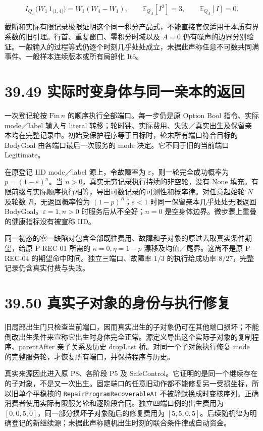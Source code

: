 \documentclass[
  11pt,
  oneside]{book}
\begin{document}
\[I_{Q_A}\bigl(W_1\,1_{(1,4]}\bigr)=W_1(W_4-W_1),
\qquad \mathbb E_{Q_A}[I^2]=3,\qquad\mathbb E_{Q_A}[I]=0.\]

截断和实际有限记录极限证明这个同一积分产品式，不能直接套仅适用于本质有界系数的旧引理。行首、重复窗口、零积分时域以及 \(A=0\) 仍有噪声的边界分别验证。一般输入的过程等式仍逐个时刻几乎处处成立，未据此声称任意不可数共同满事件、一般样本连续版本或所有局部化 Itô。

\section{39.49 实际时变身体与同一亲本的返回}\label{ux5b9eux9645ux65f6ux53d8ux8eabux4f53ux4e0eux540cux4e00ux4eb2ux672cux7684ux8fd4ux56de}

一次登记轮按 \(\mathrm{Fin}\,n\) 的顺序执行全部端口。每一步仍是原 Option Bool 指令、实际 mode／label 输入与 literal 转移；轮时钟、实际费用、失败／真实出生及保留亲本均在完整记录中。初始受保护程序等于目标时，轮末所有端口符合目标的 BodyGoal 由各端口最后一次服务的 mode 决定。它不同于旧的当前端口 Legitimate。

在原登记 IID mode／label 源上，令故障率为 \(\varepsilon\)，则一轮完全成功概率为 \(p=(1-\varepsilon)^n\)。当 \(n>0\)，真实无穷记录执行持续的非空轮，没有 None 填充。有限前缀与实际顺序执行相等，导出可数记录的可测性和概率律。对任意起始轮 \(N\) 及轮数 \(R\)，无返回概率恰为 \((1-p)^R\)；\(\varepsilon<1\) 时同一保留亲本几乎处处无限返回 BodyGoal。\(\varepsilon=1,n>0\) 时服务后从不全好；\(n=0\) 是空身体边界。微步骤上重叠的健康指标没有被宣称 IID。

同一初态的零一缺陷对包含全部既往费用、故障和子对象的原过去取真实条件期望，给原 P-REC-01 所需的 \(\kappa=0,\eta=1-p\) 漂移及均值／尾界。这尚不是原 P-REC-04 的期望命中时间。独立三端口、故障率 \(1/3\) 的执行给成功率 \(8/27\)，完整记录仍含真实付费与失败。

\section{39.50 真实子对象的身份与执行修复}\label{ux771fux5b9eux5b50ux5bf9ux8c61ux7684ux8eabux4efdux4e0eux6267ux884cux4feeux590d}

旧局部出生门只检查当前端口，因而真实出生的子对象仍可在其他端口损坏；不能倒改出生条件来宣称它出生时身体完全正常。源定义导出这个实际子对象的复制程序、parentAfter 亲子关系及历史 dropLast 桥。对同一个子对象执行修复 mode 的完整服务轮，才恢复所有端口，并保持程序与历史。

真实来源因此进入原 P8、各阶段 P5 及 SafeControl。它证明的是同一个继续存在的子对象，不是又一次出生。固定端口的任意旧动作都不能修复另一受损坐标，所以旧单个平稳核的 \nolinkurl{RepairProgramRecoverableAt} 不被静默换成时变核序列。正确消费者使用实际有限服务轮和逐阶段合同。独立四端口例的出生费用为 \([0,0,5,0]\)，同一部分损坏子对象随后的修复费用为 \([5,5,0,5]\)。后续随机律为明确登记的新继续源；未据此声称随机出生时刻的联合条件律或自动资金。
\end{document}
